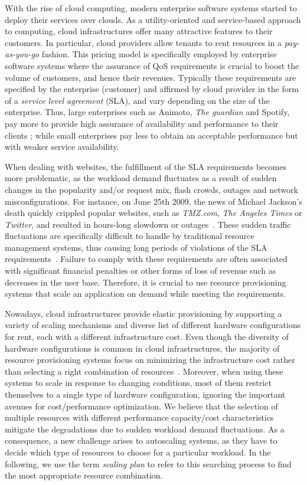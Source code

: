 With the rise of cloud computing, modern enterprise software systems
started to deploy their services over clouds. As a utility-oriented
and service-based approach to computing, cloud infrastructures offer
many attractive features to their customers.  In particular, cloud
providers allow tenants to rent resources in a \emph{pay-as-you-go}
fashion. This pricing model is specifically employed by enterprise
software systems where the assurance of QoS requirements is crucial to
boost the volume of customers, and hence their revenues. Typically
these requirements are specified by the enterprise (customer) and
affirmed by cloud provider in the form of a \emph{service level
agreement} (SLA), and vary depending on the size of the
enterprise. Thus, large enterprises such as Animoto, \emph{The
guardian} and Spotify, pay more to provide high assurance of
availability and performance to their clients \cite{casestudiescloud};
while small enterprises pay less to obtain an acceptable performance
but with weaker service availability.


When dealing with websites, the fulfillment of the SLA requirements
becomes more problematic, as the workload demand fluctuates as a
result of sudden changes in the popularity and/or request mix, flash
crowds, outages and network misconfigurations.  For instance, on June
25th 2009, the news of Michael Jackson's death quickly crippled
popular websites, such as \emph{TMZ.com}, \emph{The Angeles Times}
or \emph{Twitter}, and resulted in hours-long slowdown or
outages~\cite{outagesTimes}. These sudden traffic fluctuations are
specifically difficult to handle by traditional resource management
systems, thus causing long periods of violations of the SLA
requirements~\cite{trafficCongestion}. Failure to comply with these
requirements are often associated with significant financial penalties
or other forms of loss of revenue such as decreases in the user base.
Therefore, it is crucial to use resource provisioning systems that
scale an application on demand while meeting the requirements.

Nowadays, cloud infrastructures provide elastic provisioning by
supporting a variety of scaling mechanisms and diverse list of
different hardware configurations for rent, each with a different
infrastructure cost. Even though the diversity of hardware
configurations is common in cloud infrastructures, the majority of
resource provisioning systems focus on minimizing the infrastructure
cost rather than selecting a right combination of
resources~\cite{urgaonkar_agile_2008,dejavu2012}. Moreover,
when using these systems to scale in response to changing conditions,
most of them restrict themselves to a single type of hardware
configuration, ignoring the important avenues for cost/performance
optimization. We believe that the selection of multiple resources with
different performance capacity/cost characteristics mitigate the
degradations due to sudden workload demand fluctuations. As a
consequence, a new challenge arises to autoscaling systems, as they
have to decide which type of resources to choose for a particular
workload. In the following, we use the term \emph{scaling plan} to
refer to this searching process to find the most appropriate resource
combination.

